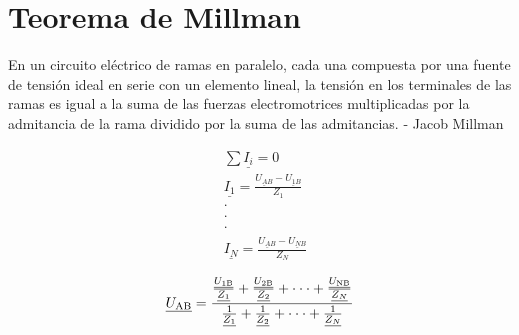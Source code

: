 \documentclass{article}
\begin{document}
\section{Teorema de Millman}
\begin{flushleft}
En un circuito eléctrico de ramas en paralelo, cada una compuesta por una fuente de tensión ideal en serie con un elemento lineal, la tensión en los terminales de las ramas es igual a la suma de las fuerzas electromotrices multiplicadas por la admitancia de la rama dividido por la suma de las admitancias. - Jacob Millman
\end{flushleft}
\begin{minipage}{0.45\textwidth}
	\centering
{}
\end{minipage}
\begin{minipage}{0.5\textwidth}
	\centering
    \begin{align*}
	& \sum \underline{I_{i}} = 0 \\
	& \underline{I_{1}} = \frac{\underline{U_{AB}} - \underline{U_{1B}}}{Z_{1}} \\
	& \cdot \\
	& \cdot \\
	& \cdot \\
	& \underline{I_{N}} = \frac{\underline{U_{AB}} - \underline{U_{NB}}}{Z_{N}}
    \end{align*}
\end{minipage}

\begin{equation}
	\Large
\underline{U_{\text{AB}}} = \frac{\frac{\underline{U_{\text{1B}}}}{\underline{Z_{1}}}+ \frac{\underline{U_{\text{2B}}}}{\underline{Z_{2}}}+\cdot \cdot \cdot + \frac{\underline{U_{\text{NB}}}}{\underline{Z_{N}}}}{\frac{1}{\underline{Z_{1}}}+\frac{1}{\underline{Z_{2}}}+ \cdot \cdot \cdot + \frac{1}{\underline{Z_{N}}}}
\end{equation}
\end{document}
